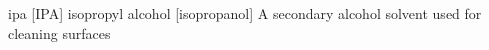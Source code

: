 \newglsXchemical%
{ipa}%
[IPA]%
{isopropyl alcohol}%
[isopropanol]%
{}%
{A secondary alcohol solvent used for cleaning surfaces}%